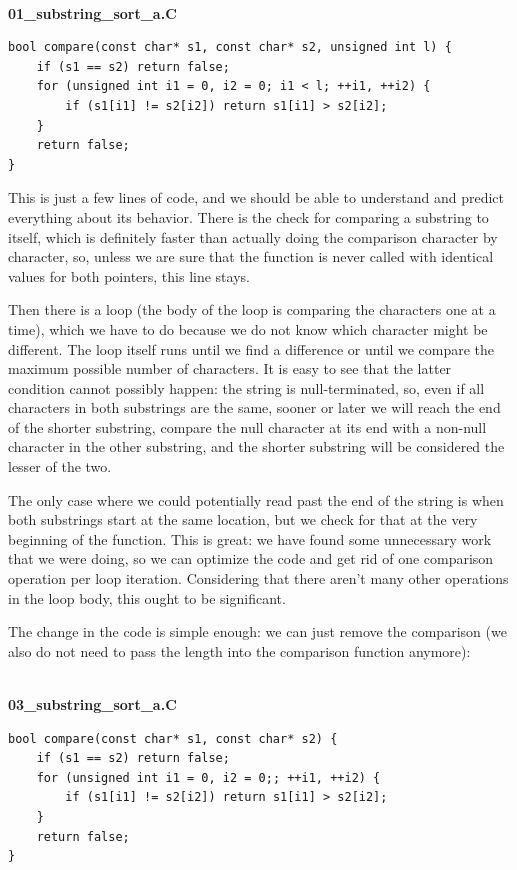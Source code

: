 \hspace*{\fill} \\ %
\noindent
\textbf{01\_substring\_sort\_a.C}
\begin{lstlisting}[style=styleCXX]
bool compare(const char* s1, const char* s2, unsigned int l) {
	if (s1 == s2) return false;
	for (unsigned int i1 = 0, i2 = 0; i1 < l; ++i1, ++i2) {
		if (s1[i1] != s2[i2]) return s1[i1] > s2[i2];
	}
	return false;
}
\end{lstlisting}

This is just a few lines of code, and we should be able to understand and predict everything about its behavior. There is the check for comparing a substring to itself, which is definitely faster than actually doing the comparison character by character, so, unless we are sure that the function is never called with identical values for both pointers, this line stays.

Then there is a loop (the body of the loop is comparing the characters one at a time), which we have to do because we do not know which character might be different. The loop itself runs until we find a difference or until we compare the maximum possible number of characters. It is easy to see that the latter condition cannot possibly happen: the string is null-terminated, so, even if all characters in both substrings are the same, sooner or later we will reach the end of the shorter substring, compare the null character at its end with a non-null character in the other substring, and the shorter substring will be considered the lesser of the two.

The only case where we could potentially read past the end of the string is when both substrings start at the same location, but we check for that at the very beginning of the function. This is great: we have found some unnecessary work that we were doing, so we can optimize the code and get rid of one comparison operation per loop iteration. Considering that there aren't many other operations in the loop body, this ought to be significant.

The change in the code is simple enough: we can just remove the comparison (we also do not need to pass the length into the comparison function anymore):

\hspace*{\fill} \\ %
\noindent
\textbf{03\_substring\_sort\_a.C}
\begin{lstlisting}[style=styleCXX]
bool compare(const char* s1, const char* s2) {
	if (s1 == s2) return false;
	for (unsigned int i1 = 0, i2 = 0;; ++i1, ++i2) {
		if (s1[i1] != s2[i2]) return s1[i1] > s2[i2];
	}
	return false;
}
\end{lstlisting}

